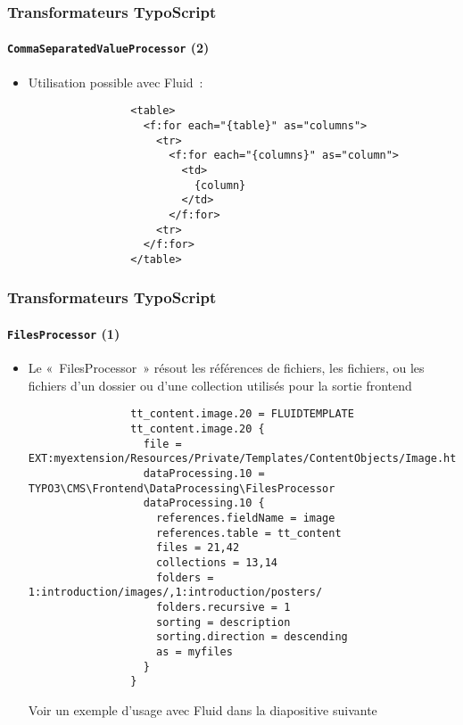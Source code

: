 \begin{frame}[fragile]
	\frametitle{Transformateurs TypoScript}
	\framesubtitle{\texttt{CommaSeparatedValueProcessor} (2)}

	\lstset{basicstyle=\tiny\ttfamily}

	\begin{itemize}

		\item Utilisation possible avec Fluid~:

			\begin{lstlisting}
				<table>
				  <f:for each="{table}" as="columns">
				    <tr>
				      <f:for each="{columns}" as="column">
				        <td>
				          {column}
				        </td>
				      </f:for>
				    <tr>
				  </f:for>
				</table>
			\end{lstlisting}

	\end{itemize}

\end{frame}


\begin{frame}[fragile]
	\frametitle{Transformateurs TypoScript}
	\framesubtitle{\texttt{FilesProcessor} (1)}

	\lstset{basicstyle=\tiny\ttfamily}

	\begin{itemize}

		\item Le «~FilesProcessor~» résout les références de fichiers, les fichiers, ou les fichiers d'un dossier
			ou d'une collection utilisés pour la sortie frontend

			\begin{lstlisting}
				tt_content.image.20 = FLUIDTEMPLATE
				tt_content.image.20 {
				  file = EXT:myextension/Resources/Private/Templates/ContentObjects/Image.html
				  dataProcessing.10 = TYPO3\CMS\Frontend\DataProcessing\FilesProcessor
				  dataProcessing.10 {
				    references.fieldName = image
				    references.table = tt_content
				    files = 21,42
				    collections = 13,14
				    folders = 1:introduction/images/,1:introduction/posters/
				    folders.recursive = 1
				    sorting = description
				    sorting.direction = descending
				    as = myfiles
				  }
				}
			\end{lstlisting}

			\small
				Voir un exemple d'usage avec Fluid dans la diapositive suivante
			\normalsize

	\end{itemize}

\end{frame}

